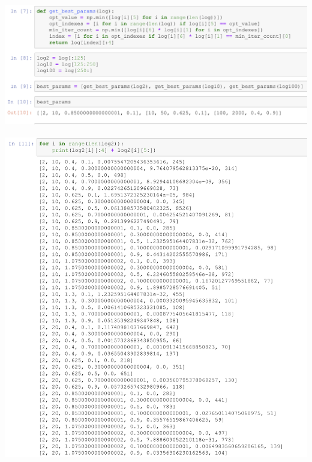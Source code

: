 \documentclass[10pt,a4paper]{article}
\begin{document}
	\includegraphics[width= \textwidth, keepaspectratio]{img/7}
	
	\includegraphics[width= \textwidth, keepaspectratio]{img/8}
	
\end{document}
